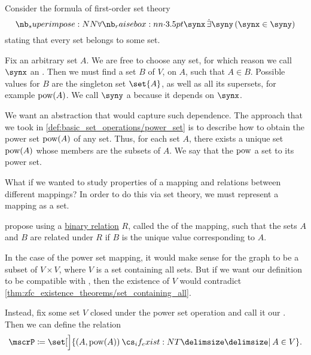 \begin{remark}\label{rem:function_definition}

  Consider the formula of first-order set theory
  \begin{equation}\label{eq:rem:function_definition}
    \qforall \synx \qexists \syny (\synx \in \syny)
  \end{equation}
  stating that every set belongs to some set.

  Fix an arbitrary set \( A \). We are free to choose any set, for which reason we call \( \synx \) an . Then we must find a set \( B \) of \( V \),  on \( A \), such that \( A \in B \). Possible values for \( B \) are the singleton set \( \set{ A } \), as well as all its supersets, for example \( \operatorname{pow}(A) \). We call \( \syny \) a  because it depends on \( \synx \).

  We want an abstraction that would capture such dependence. The approach that we took in \cref{def:basic_set_operations/power_set} is to describe how to obtain the power set \( \operatorname{pow}(A) \) of any set. Thus, for each set \( A \), there exists a unique set \( \operatorname{pow}(A) \) whose members are the subsets of \( A \). We say that the  \( \operatorname{pow} \)  a set to its power set.

  What if we wanted to study properties of a mapping and relations between different mappings? In order to do this via set theory, we must represent a mapping as a set.

   propose using a \hyperref[def:binary_relation]{binary relation} \( R \), called the  of the mapping, such that the sets \( A \) and \( B \) are related under \( R \) if \( B \) is the unique value corresponding to \( A \).

  In the case of the power set mapping, it would make sense for the graph to be a subset of \( V \times V \), where \( V \) is a set containing all sets. But if we want our definition to be compatible with \hyperref[def:zfc]{}, then the existence of \( V \) would contradict \cref{thm:zfc_existence_theorems/set_containing_all}.

  Instead, fix some set \( V \) closed under the power set operation and call it our . Then we can define the relation
  \begin{equation*}
    \mscrP \coloneqq \set[\Big]{ (A, \pow(A)) \given* A \in V }.
  \end{equation*}


\end{remark}
